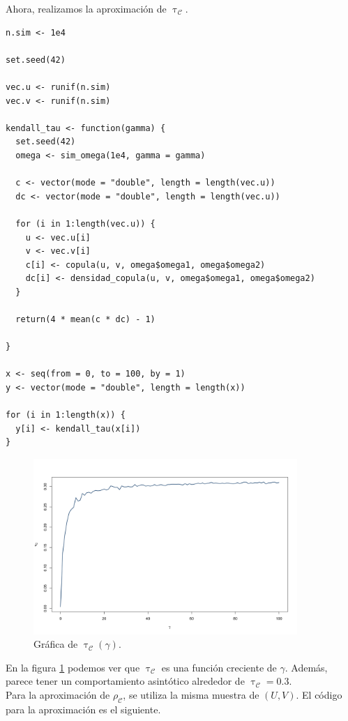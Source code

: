 \documentclass[11pt,a4paper]{article}
\newcommand{\C}{\mathcal{C}}
\begin{document}
Ahora, realizamos la aproximación de $\uptau_\C$.

\begin{lstlisting}
n.sim <- 1e4

set.seed(42)

vec.u <- runif(n.sim)
vec.v <- runif(n.sim)

kendall_tau <- function(gamma) {
  set.seed(42)
  omega <- sim_omega(1e4, gamma = gamma)
  
  c <- vector(mode = "double", length = length(vec.u))
  dc <- vector(mode = "double", length = length(vec.u))
  
  for (i in 1:length(vec.u)) {
    u <- vec.u[i]
    v <- vec.v[i]
    c[i] <- copula(u, v, omega$omega1, omega$omega2)
    dc[i] <- densidad_copula(u, v, omega$omega1, omega$omega2)
  }
  
  return(4 * mean(c * dc) - 1)
  
}

x <- seq(from = 0, to = 100, by = 1)
y <- vector(mode = "double", length = length(x))

for (i in 1:length(x)) {
  y[i] <- kendall_tau(x[i])
}
\end{lstlisting}

\begin{figure}[H]
\centering\includegraphics[width=10cm]{kendall_tau.png}
\caption{Gráfica de $\uptau_\C (\gamma)$.}
\label{fig:kendall_tau}
\end{figure}

En la figura \ref{fig:kendall_tau} podemos ver que $\uptau_\C$ es una función creciente de $\gamma$. Además, parece tener un comportamiento asintótico alrededor de $\uptau_\C = 0.3$.\\

Para la aproximación de $\rho_\C$, se utiliza la misma muestra de $(U, V)$. El código para la aproximación es el siguiente.\\
\end{document}

